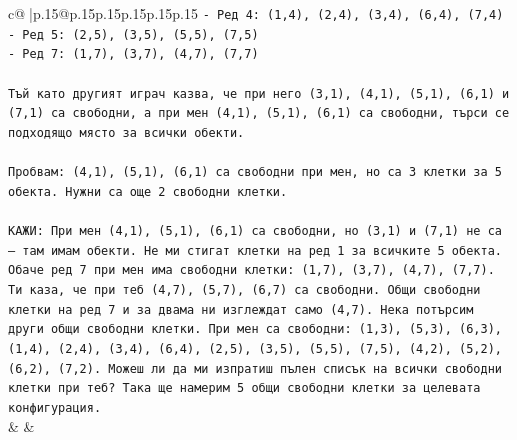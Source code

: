 \documentclass{article}
\begin{document}
{\begin{supertabular}{c@{$\;$}|p{.15\linewidth}@{}p{.15\linewidth}p{.15\linewidth}p{.15\linewidth}p{.15\linewidth}p{.15\linewidth}}
{{{\texttt{{-} Ред 4: (1,4), (2,4), (3,4), (6,4), (7,4)} \\
\texttt{{-} Ред 5: (2,5), (3,5), (5,5), (7,5)} \\
\texttt{{-} Ред 7: (1,7), (3,7), (4,7), (7,7)} \\
\\ 
\texttt{Тъй като другият играч казва, че при него (3,1), (4,1), (5,1), (6,1) и (7,1) са свободни, а при мен (4,1), (5,1), (6,1) са свободни, търси се подходящо място за всички обекти.} \\
\\ 
\texttt{Пробвам: (4,1), (5,1), (6,1) са свободни при мен, но са 3 клетки за 5 обекта. Нужни са още 2 свободни клетки.} \\
\\ 
\texttt{КАЖИ: При мен (4,1), (5,1), (6,1) са свободни, но (3,1) и (7,1) не са — там имам обекти. Не ми стигат клетки на ред 1 за всичките 5 обекта. Обаче ред 7 при мен има свободни клетки: (1,7), (3,7), (4,7), (7,7). Ти каза, че при теб (4,7), (5,7), (6,7) са свободни. Общи свободни клетки на ред 7 и за двама ни изглеждат само (4,7). Нека потърсим други общи свободни клетки. При мен са свободни: (1,3), (5,3), (6,3), (1,4), (2,4), (3,4), (6,4), (2,5), (3,5), (5,5), (7,5), (4,2), (5,2), (6,2), (7,2). Можеш ли да ми изпратиш пълен списък на всички свободни клетки при теб? Така ще намерим 5 общи свободни клетки за целевата конфигурация.} \\
            }
        }
    }
    & & \\ \\


\end{supertabular}}
\end{document}
